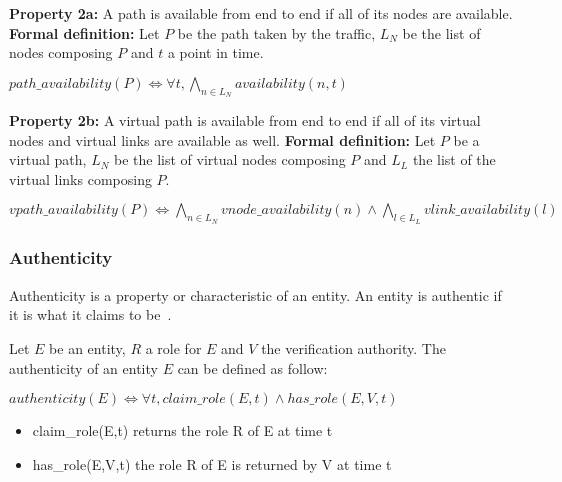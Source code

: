 \textbf{Property 2a:} A path is available from end to end if all of its nodes are available.
\newline \textbf{Formal definition:} Let $P$ be the path taken by the traffic, $L_N$ be the list of nodes composing $P$ and $t$ a point in time. 

\begin{myformula}
$path\_availability(P)\Leftrightarrow \forall t, \bigwedge\limits_{n \in L_N}availability(n,t)$
\end{myformula}


\textbf{Property 2b:} A virtual path is available from end to end if all of its virtual nodes and virtual links are available as well.
\newline \textbf{Formal definition:} Let $P$ be a virtual path, $L_N$ be the list of virtual nodes composing $P$ and $L_L$ the list of the virtual links composing $P$.

\begin{myformula}
$vpath\_availability(P)\Leftrightarrow \bigwedge\limits_{n \in L_N}vnode\_availability(n) \wedge \bigwedge\limits_{l \in L_L}vlink\_availability(l)$
\end{myformula}

\subsubsection{Authenticity}
\label{sec:prop-auth}
Authenticity is a property or characteristic of an entity.
An entity is authentic if it is what it claims to be~\cite{ISO/IEC270012013}.

Let $E$ be an entity, $R$ a role for $E$ and $V$ the verification authority.
The authenticity of an entity $E$ can be defined as follow:

\begin{myformula}
$ authenticity(E) \Leftrightarrow \forall t, claim\_role(E,t) \wedge has\_role(E,V,t)$
\end{myformula}
\begin{itemize}
\item claim\_role(E,t) returns the role R of E at time t
\item has\_role(E,V,t) the role R of E is returned by V at time t
\end{itemize}

